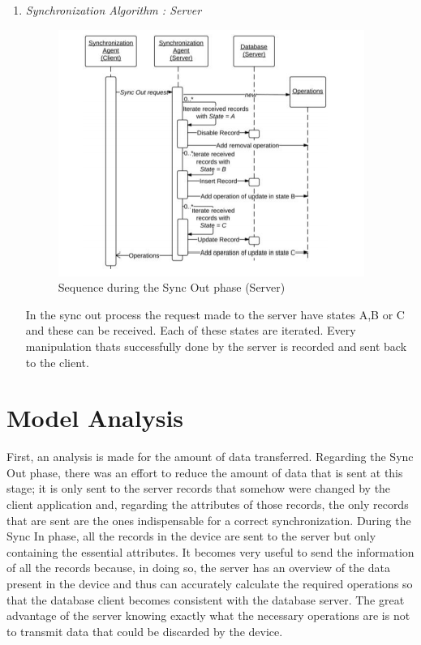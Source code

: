 \documentclass[conference]{IEEEtran}
\begin{document}
\begin{enumerate}[label=(\Alph*)]
\item  \textit{Synchronization Algorithm : Server}

\begin{figure}[h]
	\centering
	\includegraphics[trim={1.3cm 0.4cm 1.5cm 0.4cm},clip, width=1.1\linewidth]{SERVER.png} 
	\caption{Sequence during the Sync Out phase (Server)}
	\label{SERVER1}
\end{figure}

In the sync out process the request made to the server have states A,B or C and these can be received. Each of these states are iterated. Every manipulation thats successfully done by the server is recorded and sent back to the client.

\end{enumerate}

\section{Model Analysis}
First, an analysis is made for the amount of data transferred. Regarding the Sync Out phase, there was an effort to reduce the amount of data that is sent at this stage; it is only sent to the server records that somehow were changed by the client application and, regarding the attributes of those records, the only records that are sent are the ones indispensable for a correct synchronization. During the Sync In phase, all the records in the device are sent to the server but only containing the essential attributes. It becomes very useful to send the information of all the records because, in doing so, the server has an overview of the data present in the device and thus can accurately calculate the required operations so that the database client becomes consistent with the database server. The great advantage of the server knowing exactly what the necessary operations are is not to transmit data that
could be discarded by the device. 
\end{document}
